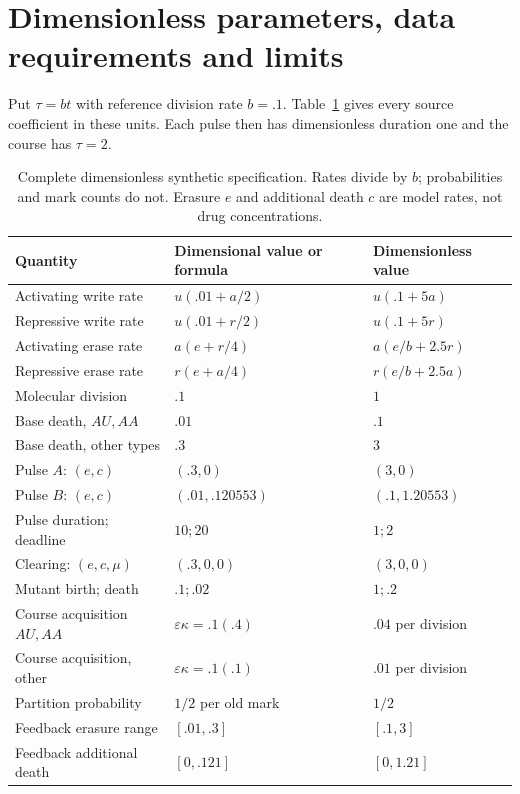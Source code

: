 \documentclass[11pt]{article}
\theoremstyle{remark}
\newcommand{\eps}{\varepsilon}
\begin{document}
\section{Dimensionless parameters, data requirements and limits}\label{sec:units}

Put $\tau=bt$ with reference division rate $b=.1$. Table~\ref{tab:units} gives
every source coefficient in these units. Each pulse then has dimensionless
duration one and the course has $\tau=2$.

\begin{table}[ht]
\centering\small
\caption{Complete dimensionless synthetic specification. Rates divide by $b$;
probabilities and mark counts do not. Erasure $e$ and additional death $c$ are
model rates, not drug concentrations.}\label{tab:units}
\begin{tabular}{lll}\toprule
Quantity&Dimensional value or formula&Dimensionless value\\\midrule
Activating write rate&$u(.01+a/2)$&$u(.1+5a)$\\
Repressive write rate&$u(.01+r/2)$&$u(.1+5r)$\\
Activating erase rate&$a(e+r/4)$&$a(e/b+2.5r)$\\
Repressive erase rate&$r(e+a/4)$&$r(e/b+2.5a)$\\
Molecular division&$.1$&$1$\\
Base death, $AU,AA$&$.01$&$.1$\\
Base death, other types&$.3$&$3$\\
Pulse $A$: $(e,c)$&$(.3,0)$&$(3,0)$\\
Pulse $B$: $(e,c)$&$(.01,.120553)$&$(.1,1.20553)$\\
Pulse duration; deadline&$10;20$&$1;2$\\
Clearing: $(e,c,\mu)$&$(.3,0,0)$&$(3,0,0)$\\
Mutant birth; death&$.1;.02$&$1;.2$\\
Course acquisition $AU,AA$&$\eps\kappa=.1(.4)$&$.04$ per division\\
Course acquisition, other&$\eps\kappa=.1(.1)$&$.01$ per division\\
Partition probability&$1/2$ per old mark&$1/2$\\
Feedback erasure range&$[.01,.3]$&$[.1,3]$\\
Feedback additional death&$[0,.121]$&$[0,1.21]$\\\bottomrule
\end{tabular}
\end{table}
\end{document}
